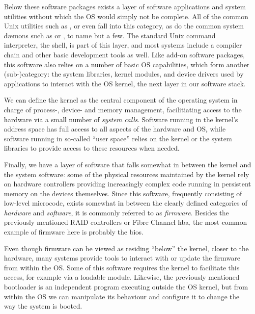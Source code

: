 Below these software packages exists a layer of
software applications and system utilities without
which the OS would simply not be complete.  All of the
common Unix utilities
such as  , or even
 fall into this category, as do the
common system d\ae mons such as  or
, to name but a few.  The standard
Unix command interpreter, the shell, is part of this
layer, and most systems include a compiler chain and
other basic development tools as well.  Like add-on
software packages, this software also relies on a
number of basic OS capabilities, which form another
(sub-)category: the system libraries, kernel modules,
and device drivers used by applications to interact
with the OS kernel, the next layer in our software
stack.

We can define the kernel as the central component of
the operating system in charge of process-, device-
and memory management, facilitiating access to the
hardware via a small number of {\em system
calls}.  Software running in the
kernel's address space has full access to all aspects
of the hardware and OS, while software running in
so-called ``user space'' relies on the kernel or the
system libraries to provide access to these resources
when needed.

Finally, we have a layer of software that falls
somewhat in between the kernel and the system
software: some of the physical resources maintained by
the kernel rely on hardware controllers providing
increasingly complex code running in persistent memory
on the devices themselves.  Since this software,
frequently consisting of low-level microcode, exists
somewhat in between the clearly defined categories of
{\em hardware} and {\em software}, it is commonly
referred to as {\em firmware}.
Besides the previously mentioned RAID controllers or
Fibre Channel \gls{hba}, the most common example of
firmware here is probably the \gls{bios}.

Even though firmware can be viewed as residing
``below'' the kernel, closer to the hardware, many
systems provide tools to interact with or update the
firmware from within the OS.  Some of this software
requires the kernel to facilitate this access, for
example via a loadable module.  Likewise, the
previously mentioned bootloader is an independent
program executing outside the OS kernel, but from
within the OS we can manipulate its behaviour and
configure it to change the way the system is booted.

